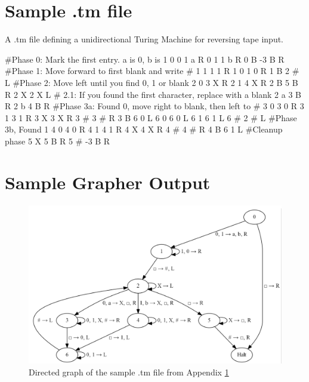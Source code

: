 \documentclass[12pt,letterpaper]{article}
\begin{document}
\appendix
\section{Sample .tm file}\label{sample}
A .tm file defining a unidirectional Turing Machine for reversing tape input.
\begin{code}
#Phase 0: Mark the first entry. a is 0, b is 1
0 0 1 a R
0 1 1 b R
0 B -3 B R
#Phase 1:  Move forward to first blank and write #
1   1   1   1  R
1   0   1   0  R
1   B   2   #  L
#Phase 2:  Move left until you find 0, 1 or blank
2   0   3   X  R
2   1   4   X  R
2   B   5   B  R
2   X   2   X  L
# 2.1: If you found the first character, replace with a blank
2   a   3   B  R
2   b   4   B  R
#Phase 3a:  Found 0, move right to blank, then left to #
3   0   3   0  R
3   1   3   1  R
3   X   3   X  R
3   #   3   #  R
3   B   6   0  L
6   0   6   0  L
6   1   6   1  L
6   #   2   #  L
#Phase 3b, Found 1
4   0   4   0  R
4   1   4   1  R
4   X   4   X  R
4   #   4   #  R
4   B   6   1  L
#Cleanup phase
5   X   5   B  R
5   #   -3  B  R
\end{code}

\section{Sample Grapher Output}
\begin{figure}[hbt!]
	\centering\includegraphics[scale=.5]{images/sample_graph.png}
	\caption{Directed graph of the sample .tm file from Appendix \ref{sample}}
\end{figure}
\end{document}
